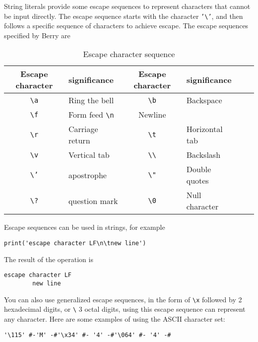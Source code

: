 String literals provide some escape sequences to represent characters that cannot be input directly. The escape sequence starts with the character \texttt{'\textbackslash'}, and then follows a specific sequence of characters to achieve escape. The escape sequences specified by Berry are
\begin{table}[htb]
    \centering
    \setlength{\tabcolsep}{4mm}
    \begin{tabular}{clclcl} \toprule
        \textbf{Escape character} & \textbf{significance} & \textbf{Escape character} & \textbf{significance} \\ \midrule
        \texttt{\textbackslash a} & Ring the bell & \texttt{\textbackslash b} & Backspace \\
        \texttt{\textbackslash f} & Form feed \texttt{\textbackslash n} & Newline \\
        \texttt{\textbackslash r} & Carriage return & \texttt{\textbackslash t} & Horizontal tab \\
        \texttt{\textbackslash v} & Vertical tab & \texttt{\textbackslash \textbackslash} & Backslash \\
        \texttt{\textbackslash '} & apostrophe & \texttt{\textbackslash "} & Double quotes \\
        \texttt{\textbackslash ?} & question mark & \texttt{\textbackslash 0} & Null character \\
        \bottomrule
    \end{tabular}
    \caption{Escape character sequence}
    \label{tab::escape_character}
\end{table}

Escape sequences can be used in strings, for example
\begin{lstlisting}[language=berry, numbers=none]
print('escape character LF\n\tnew line')
\end{lstlisting}
The result of the operation is
\begin{lstlisting}[numbers=none]
escape character LF
        new line
\end{lstlisting}

You can also use generalized escape sequences, in the form of \texttt{\textbackslash x} followed by 2 hexadecimal digits, or \texttt{\textbackslash} 3 octal digits, using this escape sequence can represent any character. Here are some examples of using the ASCII character set:
\begin{lstlisting}[language=berry, numbers=none]
'\115' #-'M' -#'\x34' #- '4' -#'\064' #- '4' -#
\end{lstlisting}

